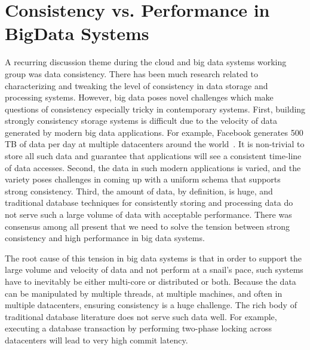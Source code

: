 \section{Consistency vs. Performance in BigData Systems}
A recurring discussion theme during the cloud and big data systems working
group was data consistency.  There has been much research related to
characterizing and tweaking the level of consistency in data storage and
processing systems.  However, big data poses novel challenges which make
questions of consistency especially tricky in contemporary systems.  First,
building strongly consistency storage systems is difficult due to the velocity
of data generated by modern big data applications.  For example, Facebook
generates 500 TB of data per day at multiple datacenters around the
world~\cite{fb_size}.  It is non-trivial to store all such data and guarantee
that applications will see a consistent time-line of data accesses.  Second, the
data in such modern applications is varied, and the variety poses challenges in
coming up with a uniform schema that supports strong consistency.  Third, the
amount of data, by definition, is huge, and traditional database techniques for
consistently storing and processing data do not serve such a large volume of
data with acceptable performance.  There was consensus among all present that
we need to solve the tension between strong consistency and high performance in
big data systems.

The root cause of this tension in big data systems is that in order to support
the large volume and velocity of data and not perform at a snail's pace, such
systems have to inevitably be either multi-core or distributed or both.  Because
the data can be manipulated by multiple threads, at multiple machines, and often
in multiple datacenters, ensuring consistency is a huge challenge.  The rich
body of traditional database literature does not serve such data well.  For
example, executing a database transaction by performing two-phase locking across
datacenters will lead to very high commit latency.

